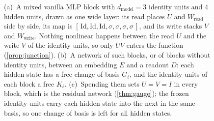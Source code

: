 \documentclass[10pt]{article}
\theoremstyle{definition}
\theoremstyle{remark}
\newcommand{\Wread}{W_{\mathrm{read}}}
\newcommand{\Wwrite}{W_{\mathrm{write}}}
\newcommand{\dm}{d_{\mathrm{model}}}
\begin{document}
\begin{figure}[t]
\caption{(a)~A mixed vanilla MLP block with $\dm = 3$ identity units and $4$ hidden units, drawn as one wide layer: its read places $U$ and $\Wread$ side by side, its map is $[\,\mathrm{Id}, \mathrm{Id}, \mathrm{Id}, \sigma, \sigma, \sigma, \sigma\,]$, and its write stacks $V$ and $\Wwrite$. Nothing nonlinear happens between the read $U$ and the write $V$ of the identity units, so only $UV$ enters the function (\cref{prop:junction}). (b)~A network of such blocks, or of blocks without identity units, between an embedding $E$ and a readout $D$: each hidden state has a free change of basis $G_\ell$, and the identity units of each block a free $K_\ell$. (c)~Spending them sets $U = V = I$ in every block, which is the residual network (\cref{thm:gauge}); the frozen identity units carry each hidden state into the next in the same basis, so one change of basis is left for all hidden states.}
\label{fig:junctions}
\end{figure}
\end{document}
